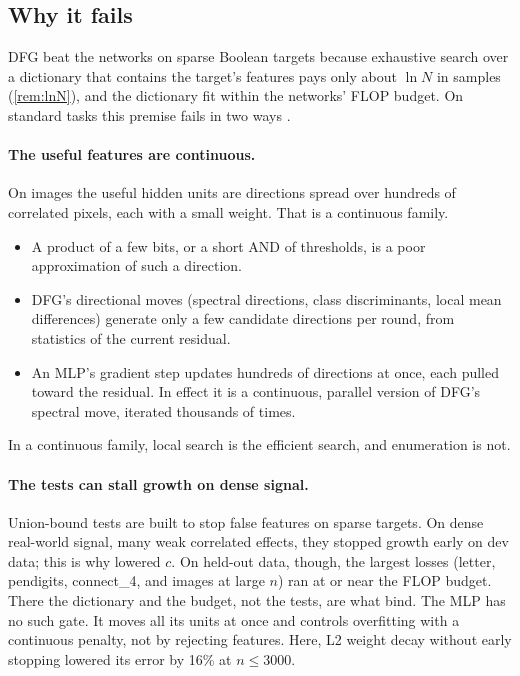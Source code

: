 \subsection{Why it fails}\label{sec:whyfail}

DFG beat the networks on sparse Boolean targets because exhaustive search over a dictionary that contains the target's features pays only about $\ln N$ in samples (\cref{rem:lnN}), and the dictionary fit within the networks' FLOP budget. On standard tasks this premise fails in two ways .

\paragraph{The useful features are continuous.} On images the useful hidden units are directions spread over hundreds of correlated pixels, each with a small weight. That is a continuous family.
\begin{itemize}
\item A product of a few bits, or a short AND of thresholds, is a poor approximation of such a direction.
\item DFG's directional moves (spectral directions, class discriminants, local mean differences) generate only a few candidate directions per round, from statistics of the current residual.
\item An MLP's gradient step updates hundreds of directions at once, each pulled toward the residual. In effect it is a continuous, parallel version of DFG's spectral move, iterated thousands of times.
\end{itemize}
In a continuous family, local search is the efficient search, and enumeration is not.

\paragraph{The tests can stall growth on dense signal.} Union-bound tests are built to stop false features on sparse targets. On dense real-world signal, many weak correlated effects, they stopped growth early on dev data; this is why  lowered $c$. On held-out data, though, the largest losses (letter, pendigits, connect\_4, and images at large $n$) ran at or near the FLOP budget. There the dictionary and the budget, not the tests, are what bind. The MLP has no such gate. It moves all its units at once and controls overfitting with a continuous penalty, not by rejecting features. Here, L2 weight decay without early stopping lowered its error by 16\% at $n\le3000$.


